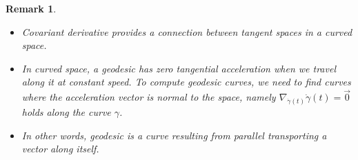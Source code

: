 \documentclass[a4paper]{article}
\theoremstyle{definition}
\theoremstyle{plain}
\newtheorem{remark}{Remark}
\begin{document}
\begin{remark}
\begin{itemize}
\begin{figure}[H]
        \caption{Difference between a vector and the parallel transported one}
    \end{figure}
    \item Covariant derivative provides a connection between tangent spaces in a curved space.
    \item In curved space, a geodesic has zero tangential acceleration when we travel along it at constant speed. To compute geodesic curves, we need to find curves where the acceleration vector is normal to the space, namely $\nabla_{\Dot{\gamma}(t)}\Dot{\gamma}(t)=\vec{0}$ holds along the curve $\gamma$.
    \item In other words, geodesic is a curve resulting from parallel transporting a vector along itself.
\end{itemize}
\end{remark}
\end{document}
